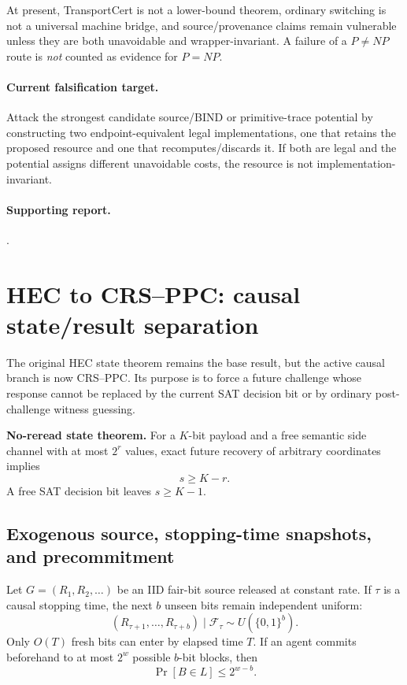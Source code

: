 \documentclass[11pt]{article}
\begin{document}
At present, TransportCert is not a lower-bound theorem, ordinary switching is not a universal
machine bridge, and source/provenance claims remain vulnerable unless they are both unavoidable and
wrapper-invariant. A failure of a \(P\neq NP\) route is \emph{not} counted as evidence for \(P=NP\).

\paragraph{Current falsification target.}
Attack the strongest candidate source/BIND or primitive-trace potential by constructing two
endpoint-equivalent legal implementations, one that retains the proposed resource and one that
recomputes/discards it. If both are legal and the potential assigns different unavoidable costs,
the resource is not implementation-invariant.

\paragraph{Supporting report.}
.

\section{HEC to CRS--PPC: causal state/result separation}

The original HEC state theorem remains the base result, but the active causal branch is now
CRS--PPC. Its purpose is to force a future challenge whose response cannot be replaced by the
current SAT decision bit or by ordinary post-challenge witness guessing.

\begin{provedbox}
\textbf{No-reread state theorem.} For a \(K\)-bit payload and a free semantic side channel
with at most \(2^r\) values, exact future recovery of arbitrary coordinates implies
\[
\boxed{s\ge K-r.}
\]
A free SAT decision bit leaves \(s\ge K-1\).
\end{provedbox}

\subsection{Exogenous source, stopping-time snapshots, and precommitment}
Let \(G=(R_1,R_2,\ldots)\) be an IID fair-bit source released at constant rate. If
\(\tau\) is a causal stopping time, the next \(b\) unseen bits remain independent uniform:
\[
\boxed{(R_{\tau+1},\ldots,R_{\tau+b})\mid\mathcal F_\tau \sim U(\{0,1\}^b).}
\]
Only \(O(T)\) fresh bits can enter by elapsed time \(T\). If an agent commits beforehand
to at most \(2^w\) possible \(b\)-bit blocks, then
\[
\boxed{\Pr[B\in L]\le2^{w-b}.}
\]
\end{document}
